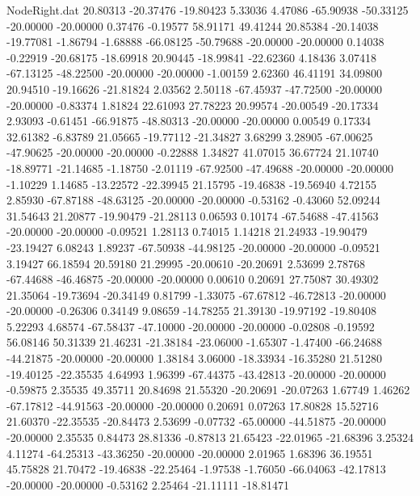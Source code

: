 \begin{filecontents}{NodeRight.dat}
  20.80313  -20.37476  -19.80423     5.33036    4.47086  -65.90938  -50.33125  -20.00000  -20.00000    0.37476   -0.19577   58.91171   49.41244
  20.85384  -20.14038  -19.77081    -1.86794   -1.68888  -66.08125  -50.79688  -20.00000  -20.00000    0.14038   -0.22919  -20.68175  -18.69918
  20.90445  -18.99841  -22.62360     4.18436    3.07418  -67.13125  -48.22500  -20.00000  -20.00000   -1.00159    2.62360   46.41191   34.09800
  20.94510  -19.16626  -21.81824     2.03562    2.50118  -67.45937  -47.72500  -20.00000  -20.00000   -0.83374    1.81824   22.61093   27.78223
  20.99574  -20.00549  -20.17334     2.93093   -0.61451  -66.91875  -48.80313  -20.00000  -20.00000    0.00549    0.17334   32.61382   -6.83789
  21.05665  -19.77112  -21.34827     3.68299    3.28905  -67.00625  -47.90625  -20.00000  -20.00000   -0.22888    1.34827   41.07015   36.67724
  21.10740  -18.89771  -21.14685    -1.18750   -2.01119  -67.92500  -47.49688  -20.00000  -20.00000   -1.10229    1.14685  -13.22572  -22.39945
  21.15795  -19.46838  -19.56940     4.72155    2.85930  -67.87188  -48.63125  -20.00000  -20.00000   -0.53162   -0.43060   52.09244   31.54643
  21.20877  -19.90479  -21.28113     0.06593    0.10174  -67.54688  -47.41563  -20.00000  -20.00000   -0.09521    1.28113    0.74015    1.14218
  21.24933  -19.90479  -23.19427     6.08243    1.89237  -67.50938  -44.98125  -20.00000  -20.00000   -0.09521    3.19427   66.18594   20.59180
  21.29995  -20.00610  -20.20691     2.53699    2.78768  -67.44688  -46.46875  -20.00000  -20.00000    0.00610    0.20691   27.75087   30.49302
  21.35064  -19.73694  -20.34149     0.81799   -1.33075  -67.67812  -46.72813  -20.00000  -20.00000   -0.26306    0.34149    9.08659  -14.78255
  21.39130  -19.97192  -19.80408     5.22293    4.68574  -67.58437  -47.10000  -20.00000  -20.00000   -0.02808   -0.19592   56.08146   50.31339
  21.46231  -21.38184  -23.06000    -1.65307   -1.47400  -66.24688  -44.21875  -20.00000  -20.00000    1.38184    3.06000  -18.33934  -16.35280
  21.51280  -19.40125  -22.35535     4.64993    1.96399  -67.44375  -43.42813  -20.00000  -20.00000   -0.59875    2.35535   49.35711   20.84698
  21.55320  -20.20691  -20.07263     1.67749    1.46262  -67.17812  -44.91563  -20.00000  -20.00000    0.20691    0.07263   17.80828   15.52716
  21.60370  -22.35535  -20.84473     2.53699   -0.07732  -65.00000  -44.51875  -20.00000  -20.00000    2.35535    0.84473   28.81336   -0.87813
  21.65423  -22.01965  -21.68396     3.25324    4.11274  -64.25313  -43.36250  -20.00000  -20.00000    2.01965    1.68396   36.19551   45.75828
  21.70472  -19.46838  -22.25464    -1.97538   -1.76050  -66.04063  -42.17813  -20.00000  -20.00000   -0.53162    2.25464  -21.11111  -18.81471

\end{filecontents}
